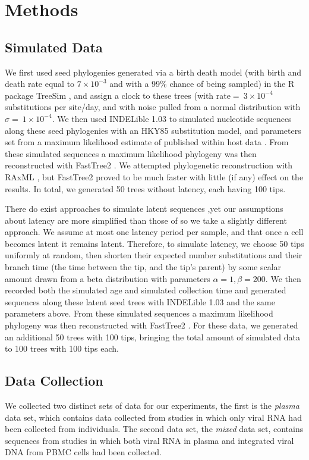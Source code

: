 \section{Methods} \label{sec:methods}
\subsection{Simulated Data} \label{subsec:simdata}
We first used seed phylogenies generated via a birth death model (with birth and death rate equal to $7\times 10^{-3}$ and with a 99\% chance of being sampled) in the R package TreeSim \citep{TreeSim, Stradler13, Boskova14}, and assign a clock to these trees (with rate$ = \ 3\times 10^{-4}$ substitutions per site/day, and with noise pulled from a normal distribution with $\sigma = \ 1\times 10^{-4}$.
We then used INDELible 1.03 \citep{Indelible09} to simulated nucleotide sequences along these seed phylogenies with an HKY85 \citep{HKY85} substitution model, and  parameters set from a maximum likelihood estimate of published within host data \citep{McCloskey14}. 
From these simulated sequences a maximum likelihood phylogeny was then reconstructed with FastTree2 \citep{FastTree10}.
We attempted phylogenetic reconstruction with RAxML \citep{Raxml14}, but FastTree2 proved to be much faster with little (if any) effect on the results. 
In total, we generated 50 trees without latency, each having 100 tips. 

There do exist approaches to simulate latent sequences \citep{Immonen14},yet our assumptions about latency are more simplified than those of \cite{Immonen14} so we take a slightly different approach.
We assume at most one latency period per sample, and that once a cell becomes latent it remains latent. 
Therefore, to simulate latency, we choose 50 tips uniformly at random, then shorten their expected number substitutions and their branch time (the time between the tip, and the tip's parent) by some scalar amount drawn from a beta distribution with parameters $\alpha=1, \beta=200$.
We then recorded both the simulated age and simulated collection time and generated sequences along these latent seed trees with INDELible 1.03 \citep{Indelible09} and the same parameters above. 
From these simulated sequences a maximum likelihood phylogeny was then reconstructed with FastTree2 \citep{FastTree10}.
For these data, we generated an additional 50 trees with 100 tips, bringing the total amount of simulated data to 100 trees with 100 tips each. 


\subsection{Data Collection} \label{subsec:dcollection}
We collected two distinct sets of data for our experiments, the first is the {\em plasma} data set, which contains data collected from studies in which only viral RNA had been collected from individuals. 
The second data set, the {\em mixed} data set, contains sequences from studies in which both viral RNA in plasma and integrated viral DNA from PBMC cells had been collected.

